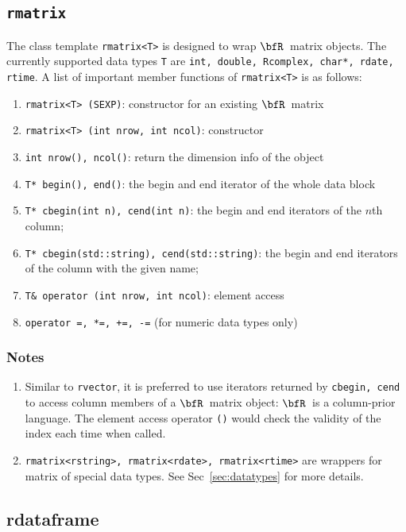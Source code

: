 \documentclass{article}
\newcommand{\R}{$\bfR$}
\begin{document}
\subsection{\texttt{rmatrix}}

The class template \texttt{rmatrix<T>} is designed to wrap
\R\ matrix objects.  The currently supported data types
\texttt{T} are \texttt{int, double, Rcomplex, char*, rdate,
rtime}.  A list of important member functions of
\texttt{rmatrix<T>} is as follows:
\begin{enumerate}
  \item \texttt{rmatrix<T> (SEXP)}: constructor for an
    existing \R\ matrix
  \item \texttt{rmatrix<T> (int nrow, int ncol)}: constructor
  \item \texttt{int nrow(), ncol()}: return the dimension
    info of the object
  \item \texttt{T* begin(), end()}: the begin and end
    iterator of the whole data block
  \item \texttt{T* cbegin(int n), cend(int n)}: the begin and
    end iterators of the $n$th column;
  \item \texttt{T* cbegin(std::string), cend(std::string)}:
    the begin and end iterators of the column with the given
    name;
  \item \texttt{T\& operator (int nrow, int ncol)}: element access
  \item \texttt{operator =, *=, +=, -=} (for numeric data
    types only)
\end{enumerate}

\subsubsection*{Notes}

\begin{enumerate}
  \item Similar to \texttt{rvector}, it is preferred to use
    iterators returned by \texttt{cbegin, cend} to access
    column members of a \R\ matrix object: \R\ is a
    column-prior language.  The element access operator
    \texttt{()} would check the validity of the index each
    time when called.
  \item \texttt{rmatrix<rstring>, rmatrix<rdate>,
    rmatrix<rtime>} are wrappers for matrix of special data
    types. See Sec~\ref{sec:datatypes} for more details.
\end{enumerate}

\subsection{rdataframe}
\end{document}
